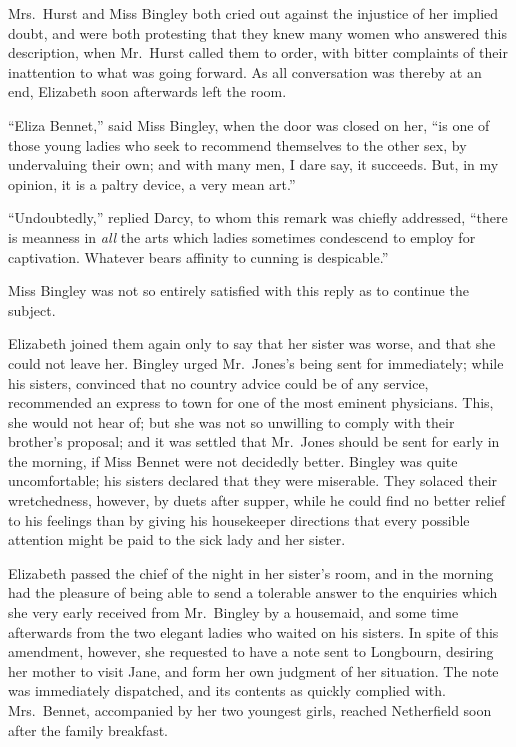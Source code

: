 Mrs.\ Hurst and Miss Bingley both cried out against the
injustice of her implied doubt, and were both protesting that
they knew many women who answered this description,
when Mr.\ Hurst called them to order, with bitter complaints
of their inattention to what was going forward. As all
conversation was thereby at an end, Elizabeth soon afterwards
left the room.

“Eliza Bennet,” said Miss Bingley, when the door was
closed on her, “is one of those young ladies who seek to
recommend themselves to the other sex, by undervaluing
their own; and with many men, I dare say, it succeeds.
But, in my opinion, it is a paltry device, a very mean art.”

“Undoubtedly,” replied Darcy, to whom this remark
was chiefly addressed, “there is meanness in \textit{all} the arts
which ladies sometimes condescend to employ for captivation.
Whatever bears affinity to cunning is despicable.”

Miss Bingley was not so entirely satisfied with this reply
as to continue the subject.

Elizabeth joined them again only to say that her sister
was worse, and that she could not leave her. Bingley
urged Mr.\ Jones’s being sent for immediately; while his
sisters, convinced that no country advice could be of any
service, recommended an express to town for one of the
most eminent physicians. This, she would not hear of;
but she was not so unwilling to comply with their brother’s
proposal; and it was settled that Mr.\ Jones should be
sent for early in the morning, if Miss Bennet were not
decidedly better. Bingley was quite uncomfortable; his
sisters declared that they were miserable. They solaced
their wretchedness, however, by duets after supper, while
he could find no better relief to his feelings than by giving
his housekeeper directions that every possible attention
might be paid to the sick lady and her sister.


Elizabeth passed the chief of the night in her sister’s
room, and in the morning had the pleasure of being able
to send a tolerable answer to the enquiries which she very
early received from Mr.\ Bingley by a housemaid, and some
time afterwards from the two elegant ladies who waited
on his sisters. In spite of this amendment, however, she
requested to have a note sent to Longbourn, desiring her
mother to visit Jane, and form her own judgment of her
situation. The note was immediately dispatched, and its
contents as quickly complied with. Mrs.\ Bennet, accompanied
by her two youngest girls, reached Netherfield soon
after the family breakfast.

